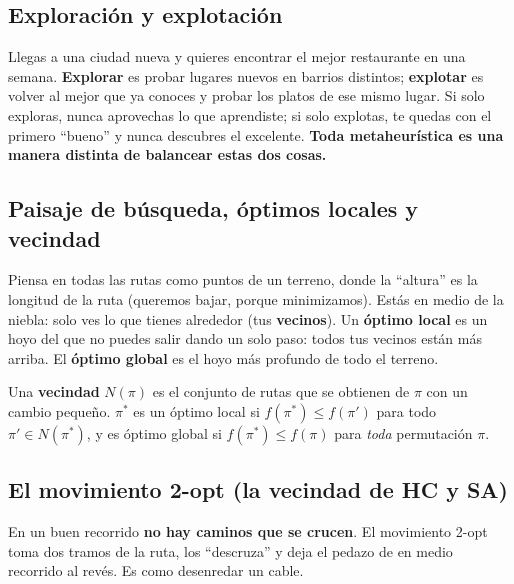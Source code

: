 \documentclass[11pt,a4paper]{article}
\begin{document}
\subsection{Exploración y explotación}

\begin{idea}
Llegas a una ciudad nueva y quieres encontrar el mejor restaurante en una semana.
\textbf{Explorar} es probar lugares nuevos en barrios distintos; \textbf{explotar} es volver al mejor que ya conoces
y probar los platos de ese mismo lugar. Si solo exploras, nunca aprovechas lo que aprendiste;
si solo explotas, te quedas con el primero ``bueno'' y nunca descubres el excelente.
\textbf{Toda metaheurística es una manera distinta de balancear estas dos cosas.}
\end{idea}

\subsection{Paisaje de búsqueda, óptimos locales y vecindad}

\begin{idea}
Piensa en todas las rutas como puntos de un terreno, donde la ``altura'' es la longitud de la ruta (queremos bajar, porque minimizamos).
Estás en medio de la niebla: solo ves lo que tienes alrededor (tus \textbf{vecinos}).
Un \textbf{óptimo local} es un hoyo del que no puedes salir dando un solo paso: todos tus vecinos están más arriba.
El \textbf{óptimo global} es el hoyo más profundo de todo el terreno.
\end{idea}

\begin{mate}
Una \textbf{vecindad} $N(\pi)$ es el conjunto de rutas que se obtienen de $\pi$ con un cambio pequeño.
$\pi^\ast$ es un óptimo local si $f(\pi^\ast)\le f(\pi')$ para todo $\pi'\in N(\pi^\ast)$,
y es óptimo global si $f(\pi^\ast)\le f(\pi)$ para \emph{toda} permutación $\pi$.
\end{mate}

\subsection{El movimiento 2-opt (la vecindad de HC y SA)}\label{sec:2opt}

\begin{idea}
En un buen recorrido \textbf{no hay caminos que se crucen}. El movimiento 2-opt toma dos tramos de la ruta,
los ``descruza'' y deja el pedazo de en medio recorrido al revés. Es como desenredar un cable.
\end{idea}
\end{document}
